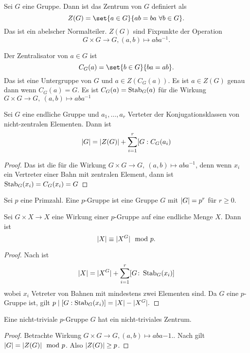 \begin{Def}
    Sei \(G\) eine Gruppe. Dann ist das Zentrum von \(G\) definiert als
    \[Z(G)=\set{a\in G}{ab=ba\ \forall b\in G}.\] Das ist ein abelscher Normalteiler. \(Z(G)\) sind Fixpunkte der Operation \[G\times G\to G, (a,b)\mapsto aba^{-1}.\]
\end{Def}
\begin{Def}
    Der Zentralisator von \(a\in G\) ist \[C_G(a)=\set{b\in G}{ba=ab}.\] Das ist eine Untergruppe von \(G\) und \(a\in Z(C_G(a))\). Es ist \(a\in Z(G)\) genau dann wenn \(C_G(a)=G\). Es ist \(C_G(a)=\operatorname{Stab}_G(a)\) für die Wirkung \(G\times G\to G,\ (a,b)\mapsto aba^{-1}\)
\end{Def}
\begin{Satz}[Klassengleichung]\label{Satz:Klassengleichung}
    Sei \(G\) eine endliche Gruppe und \(a_1,\dots,a_r\) Verteter der Konjugationsklassen von nicht-zentralen Elementen. Dann ist 
    \[\lvert G\rvert=\lvert Z(G)\rvert+\sum_{i=1}^r[G:C_G(a_i)\]
\end{Satz}
\begin{proof}
    Das ist die  für die Wirkung \(G\times G\to G,\ (a,b)\mapsto aba^{-1}\), denn wenn \(x_i\) ein Vertreter einer Bahn mit zentralen Element, dann ist \(\operatorname{Stab}_G(x_i)=C_G(x_i)=G\)
\end{proof}
\begin{Def}
    Sei \(p\) eine Primzahl. Eine \(p\)-Gruppe ist eine Gruppe \(G\) mit \(\lvert G\rvert=p^r\) für \(r\geq 0\). 
\end{Def}
\begin{Satz}\label{Satz:FixpPGrp}
    Sei \(G\times X\to X\) eine Wirkung einer \(p\)-Gruppe auf eine endliche Menge \(X\). Dann ist 
    \[\lvert X\rvert\equiv \lvert X^G\rvert\mod p.\]
\end{Satz}
\begin{proof}
    Nach  ist 
    \[\lvert X\rvert=\lvert X^G\rvert+\sum_{i=1}^r[G\colon \operatorname{Stab}_G(x_i)]\] wobei \(x_i\) Vetreter von Bahnen mit mindestens zwei Elementen sind. Da \(G\) eine \(p\)-Gruppe ist, gilt 
    \(p\mid [G:\operatorname{Stab}_G(x_i)]=\lvert X\rvert-\lvert X^G\rvert.\)
\end{proof}
\begin{Satz}\label{Satz:pGrpZentrum}
    Eine nicht-triviale \(p\)-Gruppe \(G\) hat ein nicht-triviales Zentrum.
\end{Satz}
\begin{proof}
    Betrachte Wirkung \(G\times G\to G, (a,b)\mapsto aba{-1}.\). Nach  gilt \(\lvert G\rvert=\lvert Z(G)\rvert\mod p\). Also \(\lvert Z(G)\rvert\geq p\).
\end{proof}

